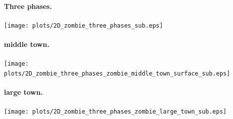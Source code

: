 \documentclass[%
twoside,                 %
final,                   %
10pt]{article}
\begin{document}
\paragraph{Three phases.}
\centerline{\texttt{[image: plots/2D\_zombie\_three\_phases\_sub.eps]}}



\paragraph{middle town.}
\centerline{\texttt{[image: plots/2D\_zombie\_three\_phases\_zombie\_middle\_town\_surface\_sub.eps]}}



\paragraph{large town.}
\centerline{\texttt{[image: plots/2D\_zombie\_three\_phases\_zombie\_large\_town\_sub.eps]}}
\end{document}
